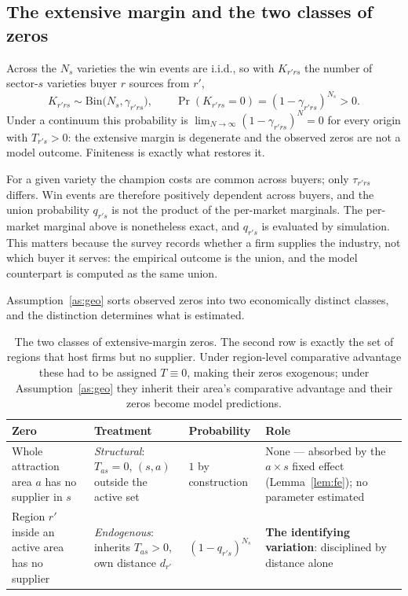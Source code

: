 \subsection{The extensive margin and the two classes of zeros}
\label{app:model-zeros}

Across the $N_{s}$ varieties the win events are i.i.d., so with $K_{r'rs}$ the number of
sector-$s$ varieties buyer $r$ sources from $r'$,
\begin{equation}
K_{r'rs}\sim\mathrm{Bin}\big(N_{s},\gamma_{r'rs}\big),
\qquad
\Pr(K_{r'rs}=0)=(1-\gamma_{r'rs})^{N_{s}}>0 .
\end{equation}
Under a continuum this probability is $\lim_{N\to\infty}(1-\gamma_{r'rs})^{N}=0$ for every
origin with $T_{r's}>0$: the extensive margin is degenerate and the observed zeros are not a
model outcome. Finiteness is exactly what restores it.

\begin{remark}
\label{rem:dependence}
For a given variety the champion costs are common across buyers; only $\tau_{r'rs}$ differs. Win
events are therefore positively dependent across buyers, and the union probability $q_{r's}$ is
not the product of the per-market marginals. The per-market marginal above is nonetheless exact,
and $q_{r's}$ is evaluated by simulation. This matters because the survey records whether a firm
supplies the industry, not which buyer it serves: the empirical outcome is the union, and the
model counterpart is computed as the same union.
\end{remark}

Assumption~\ref{as:geo} sorts observed zeros into two economically distinct classes, and the
distinction determines what is estimated.

\begin{table}[htbp]
\centering
\small
\begin{tabular}{@{}p{}p{}p{}p{}@{}}
\toprule
\textbf{Zero} & \textbf{Treatment} & \textbf{Probability} & \textbf{Role}\\
\midrule
Whole attraction area $a$ has no supplier in $s$
& \emph{Structural}: $T_{as}=0$, $(s,a)$ outside the active set
& $1$ by construction
& None --- absorbed by the $a\times s$ fixed effect (Lemma~\ref{lem:fe}); no parameter estimated\\[4pt]
Region $r'$ inside an active area has no supplier
& \emph{Endogenous}: inherits $T_{as}>0$, own distance $d_{r'}$
& $(1-q_{r's})^{N_{s}}$
& \textbf{The identifying variation}: disciplined by distance alone\\
\bottomrule
\end{tabular}
\caption{The two classes of extensive-margin zeros. The second row is exactly the set of regions
that host firms but no supplier. Under region-level comparative advantage these had to be
assigned $T\equiv0$, making their zeros exogenous; under Assumption~\ref{as:geo} they inherit
their area's comparative advantage and their zeros become model predictions.}
\label{tab:app-hierarchy}
\end{table}

